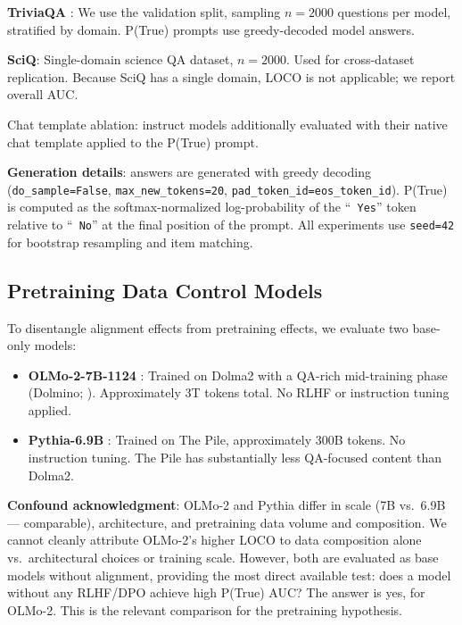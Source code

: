 \documentclass[11pt]{article}
\begin{document}
\textbf{TriviaQA} \citep{joshi2017}: We use the validation split, sampling $n=2000$ questions per model, stratified by domain. P(True) prompts use greedy-decoded model answers.

\textbf{SciQ}: Single-domain science QA dataset, $n=2000$. Used for cross-dataset replication. Because SciQ has a single domain, LOCO is not applicable; we report overall AUC.

Chat template ablation: instruct models additionally evaluated with their native chat template applied to the P(True) prompt.

\textbf{Generation details}: answers are generated with greedy decoding (\texttt{do\_sample=False}, \texttt{max\_new\_tokens=20}, \texttt{pad\_token\_id=eos\_token\_id}). P(True) is computed as the softmax-normalized log-probability of the ``\texttt{ Yes}'' token relative to ``\texttt{ No}'' at the final position of the prompt. All experiments use \texttt{seed=42} for bootstrap resampling and item matching.

\subsection{Pretraining Data Control Models}

To disentangle alignment effects from pretraining effects, we evaluate two base-only models:

\begin{itemize}
  \item \textbf{OLMo-2-7B-1124} \citep{groeneveld2024}: Trained on Dolma2 with a QA-rich mid-training phase (Dolmino; \citealt{soldaini2024}). Approximately 3T tokens total. No RLHF or instruction tuning applied.
  \item \textbf{Pythia-6.9B} \citep{biderman2023}: Trained on The Pile, approximately 300B tokens. No instruction tuning. The Pile has substantially less QA-focused content than Dolma2.
\end{itemize}

\textbf{Confound acknowledgment}: OLMo-2 and Pythia differ in scale (7B vs.\ 6.9B --- comparable), architecture, and pretraining data volume and composition. We cannot cleanly attribute OLMo-2's higher LOCO to data composition alone vs.\ architectural choices or training scale. However, both are evaluated as base models without alignment, providing the most direct available test: does a model without any RLHF/DPO achieve high P(True) AUC? The answer is yes, for OLMo-2. This is the relevant comparison for the pretraining hypothesis.
\end{document}
